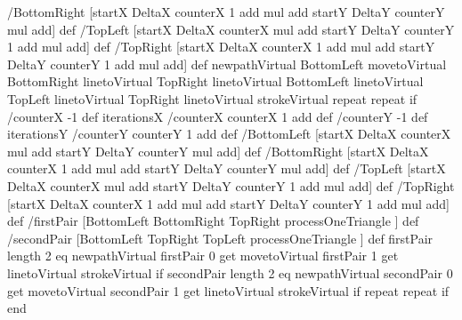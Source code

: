 {{{{{{{/BottomRight [startX DeltaX counterX 1 add mul add startY DeltaY counterY mul add] def
/TopLeft [startX DeltaX counterX mul add startY DeltaY counterY 1 add mul add] def
/TopRight [startX DeltaX counterX 1 add mul add startY DeltaY counterY 1 add mul add] def
newpathVirtual
BottomLeft \fcCoordsPStricksToPS  movetoVirtual
BottomRight \fcCoordsPStricksToPS linetoVirtual
TopRight \fcCoordsPStricksToPS linetoVirtual
BottomLeft \fcCoordsPStricksToPS linetoVirtual
TopLeft \fcCoordsPStricksToPS linetoVirtual
TopRight \fcCoordsPStricksToPS linetoVirtual
strokeVirtual
}repeat
}repeat
}if
\fcLineFormatCodeVirtual
/counterX -1 def
iterationsX {
/counterX counterX 1 add def
/counterY -1 def
iterationsY {
/counterY counterY 1 add def
%
/BottomLeft [startX DeltaX counterX mul add startY DeltaY counterY mul add] def
/BottomRight [startX DeltaX counterX 1 add mul add startY DeltaY counterY mul add] def
/TopLeft [startX DeltaX counterX mul add startY DeltaY counterY 1 add mul add] def
/TopRight [startX DeltaX counterX 1 add mul add startY DeltaY counterY 1 add mul add] def
/firstPair  [BottomLeft BottomRight TopRight processOneTriangle ] def
/secondPair [BottomLeft TopRight    TopLeft  processOneTriangle ] def
firstPair length 2 eq
{newpathVirtual
firstPair 0 get \fcCoordsPStricksToPS movetoVirtual
firstPair 1 get \fcCoordsPStricksToPS linetoVirtual
strokeVirtual
}if
secondPair length 2 eq
{newpathVirtual
secondPair 0 get \fcCoordsPStricksToPS movetoVirtual
secondPair 1 get \fcCoordsPStricksToPS linetoVirtual
strokeVirtual
}if
}repeat
}repeat
}if
end
}}%
}%

\newcommand{\fcGrid}[8][]{%
\setkeys{fcGraphics}{#1}%
\pscustom{%
\code{%
20 dict begin
/startX #2\space def
/startY #3\space def
/iterationsX #4\space def
/iterationsY #5\space def
/DeltaX #6\space def
/DeltaY #7\space def
/stickyPiece (#8) () eq (#8) ( ) eq or {0}{#8}ifelse def
\fcLineFormatCode
/counterX -1 def
iterationsX 1 add{
/counterX counterX 1 add def
/currentX1 counterX DeltaX mul startX add def
/currentY1 0        stickyPiece sub DeltaY mul startY add def
/currentY2 iterationsY stickyPiece add DeltaY mul startY add def
/currentX2 currentX1 def
newpath
[currentX1 currentY1] \fcCoordsPStricksToPS moveto
[currentX2 currentY2] \fcCoordsPStricksToPS lineto
stroke
} repeat
/counterY -1 def
iterationsY 1 add{
/counterY counterY 1 add def
/currentX1 0        stickyPiece sub DeltaX mul startX add def
/currentY1 counterY DeltaY mul startY add def
/currentY2 currentY1 def
/currentX2 iterationsX stickyPiece add DeltaX mul startX add def
newpath
[currentX1 currentY1] \fcCoordsPStricksToPS moveto
[currentX2 currentY2] \fcCoordsPStricksToPS lineto
stroke
} repeat
end
}%
}%
}

